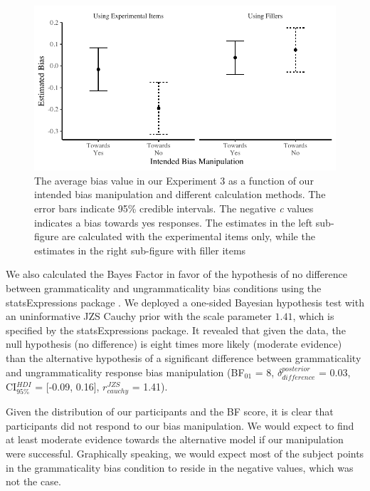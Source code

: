 \begin{knitrout}
\color{fgcolor}\begin{figure}[hbt!]

{\centering \includegraphics[width=\linewidth]{figure/OurBiasBFPlot-1} 

}

\caption{The average bias value in our Experiment 3 as a function of our intended bias manipulation and different calculation methods. The error bars indicate 95\% credible intervals. The negative \emph{c} values indicates a bias towards yes responses. The estimates in the left sub-figure are calculated with the experimental items only, while the estimates in the right sub-figure with filler items}\label{fig:OurBiasBFPlot}
\end{figure}

\end{knitrout}

We also calculated the Bayes Factor in favor of the hypothesis of no difference between grammaticality and ungrammaticality bias conditions using the statsExpressions package \citep{statsExpressions}. We deployed a one-sided Bayesian hypothesis test with an uninformative JZS Cauchy prior with the scale parameter $1.41$, which is specified by the statsExpressions package. It revealed that given the data, the null hypothesis (no difference) is eight times more likely (moderate evidence) than the alternative hypothesis of a significant difference between grammaticality and ungrammaticality response bias manipulation (BF$_{01}$ = 8, $\delta_{difference}^{posterior}$ = 0.03, CI$_{95\%}^{HDI}$ = [-0.09, 0.16], $r_{cauchy}^{JZS}$ = 1.41).

Given the distribution of our participants and the BF score, it is clear that participants did not respond to our bias manipulation.
We would expect to find at least moderate evidence towards the alternative model if our manipulation were successful. Graphically speaking, we would expect most of the subject points in the grammaticality bias condition to reside in the negative values, which was not the case.

